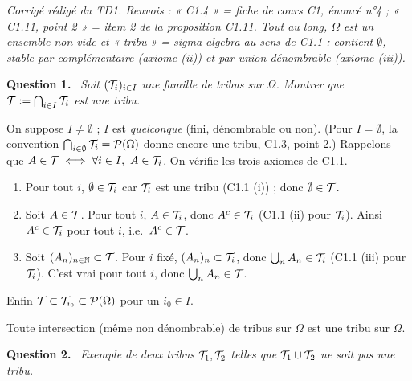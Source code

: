 \documentclass[11pt,a4paper]{article}
\newcommand{\question}[1]{\par\medskip\noindent\textbf{Question #1.}~}
\begin{document}

\textit{Corrigé rédigé du TD1. Renvois : « C1.4 » = fiche de cours C1, énoncé n°4 ; « C1.11, point 2 » = item 2 de
la proposition C1.11. Tout au long, $\Omega$ est un ensemble non vide et « tribu » = \emph{sigma-algebra} au sens de C1.1 :
contient $\emptyset$, stable par complémentaire (axiome (ii)) et par union dénombrable (axiome (iii)).}

\begin{exo}

\question{1} \emph{Soit $(\mathcal{T}_i)_{i\in I}$ une famille de tribus sur $\Omega$. Montrer que $\mathcal{T}:=\bigcap_{i\in I}\mathcal{T}_i$ est une tribu.}

On suppose $I\neq\emptyset$ ; $I$ est \emph{quelconque} (fini, dénombrable ou non). (Pour $I=\emptyset$, la convention
$\bigcap_{i\in\emptyset}\mathcal{T}_i=\mathcal{P}(\Omega)$ donne encore une tribu, C1.3, point 2.) Rappelons que
$A\in\mathcal{T}\iff\forall i\in I,\ A\in\mathcal{T}_i$. On vérifie les trois axiomes de C1.1.
\begin{enumerate}[label=(\roman*)]
  \item Pour tout $i$, $\emptyset\in\mathcal{T}_i$ car $\mathcal{T}_i$ est une tribu (C1.1 (i)) ; donc $\emptyset\in\mathcal{T}$.
  \item Soit $A\in\mathcal{T}$. Pour tout $i$, $A\in\mathcal{T}_i$, donc $A^c\in\mathcal{T}_i$ (C1.1 (ii) pour $\mathcal{T}_i$). Ainsi $A^c\in\mathcal{T}_i$ pour tout $i$, i.e.\ $A^c\in\mathcal{T}$.
  \item Soit $(A_n)_{n\in\mathbb{N}}\subset\mathcal{T}$. Pour $i$ fixé, $(A_n)_n\subset\mathcal{T}_i$, donc $\bigcup_nA_n\in\mathcal{T}_i$ (C1.1 (iii) pour $\mathcal{T}_i$).
  C'est vrai pour tout $i$, donc $\bigcup_nA_n\in\mathcal{T}$.
\end{enumerate}
Enfin $\mathcal{T}\subset\mathcal{T}_{i_0}\subset\mathcal{P}(\Omega)$ pour un $i_0\in I$.
\begin{resultat}
Toute intersection (même non dénombrable) de tribus sur $\Omega$ est une tribu sur $\Omega$.
\end{resultat}

\question{2} \emph{Exemple de deux tribus $\mathcal{T}_1,\mathcal{T}_2$ telles que $\mathcal{T}_1\cup\mathcal{T}_2$ ne soit pas une tribu.}


\end{exo}
\end{document}
